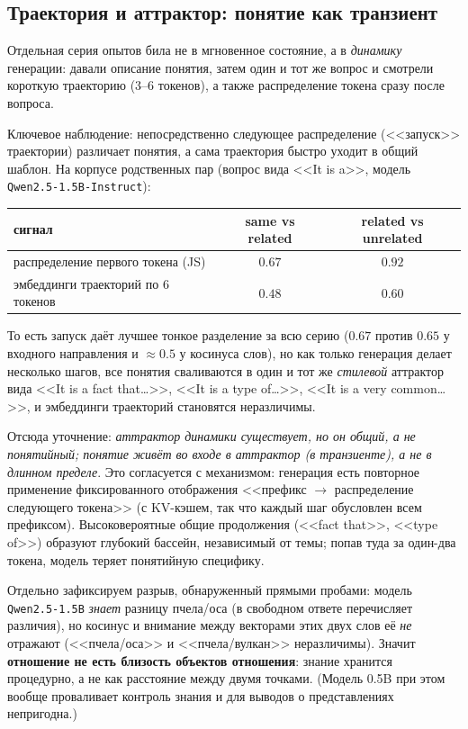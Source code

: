\documentclass[11pt,a4paper]{article}
\theoremstyle{definition}
\theoremstyle{plain}
\begin{document}
\subsection{Траектория и аттрактор: понятие как транзиент}

Отдельная серия опытов била не в мгновенное состояние, а в \emph{динамику} генерации:
давали описание понятия, затем один и тот же вопрос и смотрели короткую траекторию
(3--6 токенов), а также распределение токена сразу после вопроса.

Ключевое наблюдение: непосредственно следующее распределение (<<запуск>> траектории)
различает понятия, а сама траектория быстро уходит в общий шаблон. На корпусе родственных
пар (вопрос вида <<It is a>>, модель \texttt{Qwen2.5-1.5B-Instruct}):
\begin{center}
\begin{tabular}{@{}lcc@{}}
\toprule
сигнал & same vs related & related vs unrelated\\
\midrule
распределение первого токена (JS) & $0.67$ & $0.92$\\
эмбеддинги траекторий по 6 токенов & $0.48$ & $0.60$\\
\bottomrule
\end{tabular}
\end{center}
То есть запуск даёт лучшее тонкое разделение за всю серию ($0.67$ против $0.65$ у входного
направления и $\approx0.5$ у косинуса слов), но как только генерация делает несколько
шагов, все понятия сваливаются в один и тот же \emph{стилевой} аттрактор вида <<It is a
fact that\ldots>>, <<It is a type of\ldots>>, <<It is a very common\ldots>>, и эмбеддинги
траекторий становятся неразличимы.

Отсюда уточнение: \emph{аттрактор динамики существует, но он общий, а не понятийный;
понятие живёт во входе в аттрактор (в транзиенте), а не в длинном пределе}. Это
согласуется с механизмом: генерация есть повторное применение фиксированного отображения
<<префикс $\to$ распределение следующего токена>> (с KV-кэшем, так что каждый шаг обусловлен
всем префиксом). Высоковероятные общие продолжения (<<fact that>>, <<type of>>) образуют
глубокий бассейн, независимый от темы; попав туда за один-два токена, модель теряет
понятийную специфику.

Отдельно зафиксируем разрыв, обнаруженный прямыми пробами: модель
\texttt{Qwen2.5-1.5B} \emph{знает} разницу пчела/оса (в свободном ответе перечисляет
различия), но косинус и внимание между векторами этих двух слов её \emph{не} отражают
(<<пчела/оса>> и <<пчела/вулкан>> неразличимы). Значит \textbf{отношение не есть близость
объектов отношения}: знание хранится процедурно, а не как расстояние между двумя точками.
(Модель 0.5B при этом вообще проваливает контроль знания и для выводов о представлениях
непригодна.)
\end{document}
